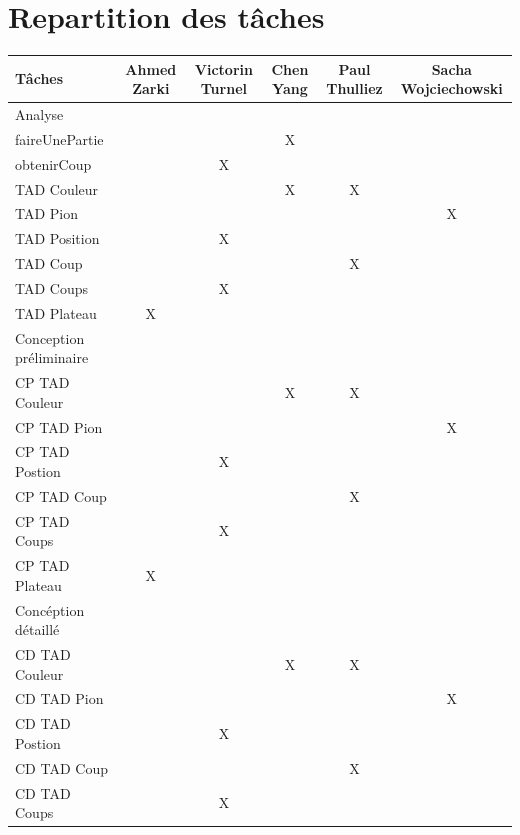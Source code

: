 \documentclass{article}
\begin{document}
\section{Repartition des tâches}
\begin{tabular}{|l|c|c|c|c|c|}
  \hline
  Tâches & Ahmed Zarki & Victorin Turnel & Chen Yang & Paul Thulliez & Sacha Wojciechowski \\
  \hline
  Analyse \\
  \hline
  faireUnePartie & & & X & & \\
  obtenirCoup & & X & & & \\
  TAD Couleur  & & & X & X &   \\
  TAD Pion & & & & & X \\
  TAD Position & & X & & &   \\
  TAD Coup & & & & X & \\
  TAD Coups & & X  & & &  \\
  TAD Plateau & X & & & & \\
  \hline
  Conception préliminaire \\
  \hline
  CP TAD Couleur & & & X & X & \\
  CP TAD Pion & & & & & X \\
  CP TAD Postion & & X & & &  \\
  CP TAD Coup & & & & X & \\              
  CP TAD Coups & & X & & & \\             
  CP TAD Plateau & X & & & & \\
  \hline
  Concéption détaillé \\
  \hline
  CD TAD Couleur & & & X & X & \\                                                                                                                                                                       
  CD TAD Pion & & & & & X \\                                                                                   
  CD TAD Postion & & X & & &  \\                                                                                                                                                                         
  CD TAD Coup & & & & X & \\                                                                                                                                                                             
  CD TAD Coups & & X & & & \\                                                                                                                                                                            

\end{tabular}
\end{document}
